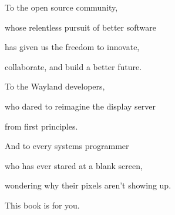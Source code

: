 
\thispagestyle{empty}

\vspace*{\fill}

\begin{center}
    \large\itshape

    To the open source community,

    whose relentless pursuit of better software

    has given us the freedom to innovate,

    collaborate, and build a better future.

    \vspace{2cm}

    To the Wayland developers,

    who dared to reimagine the display server

    from first principles.

    \vspace{2cm}

    And to every systems programmer

    who has ever stared at a blank screen,

    wondering why their pixels aren't showing up.

    \vspace{1cm}

    This book is for you.

\end{center}

\vspace*{\fill}

\clearpage

